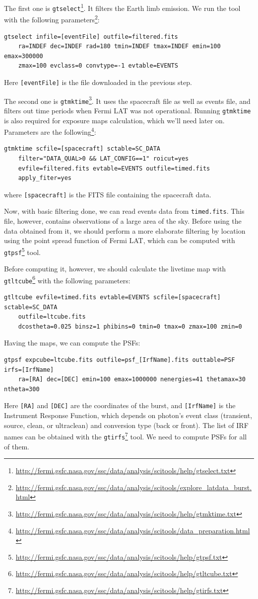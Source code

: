 \documentclass{article}
\begin{document}
The first one is \texttt{gtselect}\footnote{\url{http://fermi.gsfc.nasa.gov/ssc/data/analysis/scitools/help/gtselect.txt}}.
It filters the Earth limb emission.
We run the tool with the following parameters\footnote{\url{http://fermi.gsfc.nasa.gov/ssc/data/analysis/scitools/explore_latdata_burst.html}}:
\begin{lstlisting}
gtselect infile=[eventFile] outfile=filtered.fits
	ra=INDEF dec=INDEF rad=180 tmin=INDEF tmax=INDEF emin=100 emax=300000
	zmax=100 evclass=0 convtype=-1 evtable=EVENTS
\end{lstlisting}
Here \texttt{[eventFile]} is the file downloaded in the previous step.

The second one is \texttt{gtmktime}\footnote{\url{http://fermi.gsfc.nasa.gov/ssc/data/analysis/scitools/help/gtmktime.txt}}. It uses the spacecraft file as well as events file, and filters out time periods when Fermi LAT was not operational. Running \texttt{gtmktime} is also required for exposure maps calculation, which we'll need later on. Parameters are the following\footnote{\url{http://fermi.gsfc.nasa.gov/ssc/data/analysis/scitools/data_preparation.html}}:
\begin{lstlisting}
gtmktime scfile=[spacecraft] sctable=SC_DATA
	filter="DATA_QUAL>0 && LAT_CONFIG==1" roicut=yes
	evfile=filtered.fits evtable=EVENTS outfile=timed.fits
	apply_fiter=yes
\end{lstlisting}
where \texttt{[spacecraft]} is the FITS file containing the spacecraft data.

Now, with basic filtering done, we can read events data from \texttt{timed.fits}. This file, however, contains observations of a large area of the sky. Before using the data obtained from it, we should perform a more elaborate filtering by location using the point spread function of Fermi LAT, which can be computed with \texttt{gtpsf}\footnote{\url{http://fermi.gsfc.nasa.gov/ssc/data/analysis/scitools/help/gtpsf.txt}} tool.

Before computing it, however, we should calculate the livetime map with \texttt{gtltcube}\footnote{\url{http://fermi.gsfc.nasa.gov/ssc/data/analysis/scitools/help/gtltcube.txt}} with the following parameters:
\begin{lstlisting}
gtltcube evfile=timed.fits evtable=EVENTS scfile=[spacecraft] sctable=SC_DATA
	outfile=ltcube.fits
	dcostheta=0.025 binsz=1 phibins=0 tmin=0 tmax=0 zmax=100 zmin=0
\end{lstlisting}

Having the maps, we can compute the PSFs:
\begin{lstlisting}
gtpsf expcube=ltcube.fits outfile=psf_[IrfName].fits outtable=PSF irfs=[IrfName]
	ra=[RA] dec=[DEC] emin=100 emax=1000000 nenergies=41 thetamax=30 ntheta=300
\end{lstlisting}
Here \texttt{[RA]} and \texttt{[DEC]} are the coordinates of the burst, and \texttt{[IrfName]} is the Instrument Response Function, which depends on photon's event class (transient, source, clean, or ultraclean) and conversion type (back or front). The list of IRF names can be obtained with the \texttt{gtirfs}\footnote{\url{http://fermi.gsfc.nasa.gov/ssc/data/analysis/scitools/help/gtirfs.txt}} tool. We need to compute PSFs for all of them.
\end{document}
